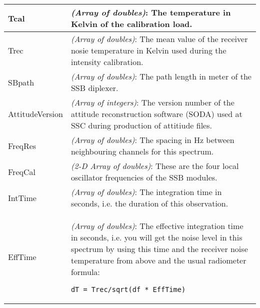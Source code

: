 \begin{longtable}{| p{} | p{} |}
     Tcal            & \emph{(Array of doubles)}: The temperature in Kelvin of the calibration load.\\ \hline
     Trec            & \emph{(Array of doubles)}: The mean value of the receiver nosie temperature 
                       in Kelvin used during the intensity calibration.\\ \hline
     SBpath          & \emph{(Array of doubles)}: The path length in meter of the SSB diplexer. \\ \hline
     AttitudeVersion & \emph{(Array of integers)}: The version number of the attitude reconstruction software (SODA) 
                         used at SSC during production of attitiude files.\\  \hline
     FreqRes         & \emph{(Array of doubles)}: The spacing in Hz between neighbouring channels for this spectrum. \\ \hline
     FreqCal         & \emph{(2-D Array of doubles)}:  These are the four local oscillator frequencies of the SSB modules.\\ \hline
     IntTime         & \emph{(Array of doubles)}: The integration time in seconds, i.e. the duration of this observation.\\ \hline
     EffTime         & \emph{(Array of doubles)}: The effective integration time in seconds, i.e. you will get the
                         noise level in this spectrum by using this time and the receiver noise 
                         temperature from above and the usual radiometer formula:
                        \begin{verbatim}dT = Trec/sqrt(df * EffTime)\end{verbatim}

\end{longtable}
